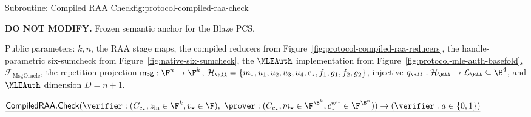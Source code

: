 \begin{protocolbox}{Subroutine: Compiled RAA Check}{fig:protocol-compiled-raa-check}
\scriptsize\raggedright
\noindent\textbf{DO NOT MODIFY.} Frozen semantic anchor for the Blaze PCS.

\smallskip
\noindent Public parameters: \(k,n\), the RAA stage maps, the compiled reducers
from Figure~\ref{fig:protocol-compiled-raa-reducers}, the handle-parametric six-sumcheck
from Figure~\ref{fig:native-six-sumcheck}, the \(\MLEAuth\) implementation
from Figure~\ref{fig:protocol-mle-auth-basefold},
\(\mathcal F_{\mathrm{MsgOracle}}\), the repetition projection
\(\mathsf{msg}:\F^n\to\F^k\), \(\mathcal H_{\RAA}=\{m_\star,u_1,u_2,u_3,u_4,c_\star,f_1,g_1,f_2,g_2\}\), injective \(q_{\RAA}:\mathcal H_{\RAA}\to\mathcal L_{\RAA}\subseteq\B^4\), and \(\MLEAuth\) dimension \(D=n+1\).

\smallskip
\noindent\(\underline{\mathsf{CompiledRAA.Check}(\verifier:(C_{c_\star},z_{\mathrm{in}}\in\F^k,v_\star\in\F),\ \prover:(C_{c_\star},m_\star\in\F^{\B^k},c_\star^{\mathrm{wit}}\in\F^{\B^n}))\to(\verifier:a\in\{0,1\})}\)


\end{protocolbox}
